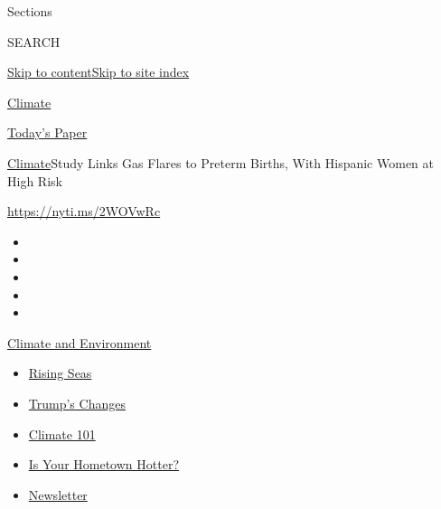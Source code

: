 Sections

SEARCH

\protect\hyperlink{site-content}{Skip to
content}\protect\hyperlink{site-index}{Skip to site index}

\href{https://www.nytimes3xbfgragh.onion/section/climate}{Climate}

\href{https://myaccount.nytimes3xbfgragh.onion/auth/login?response_type=cookie\&client_id=vi}{}

\href{https://www.nytimes3xbfgragh.onion/section/todayspaper}{Today's
Paper}

\href{/section/climate}{Climate}\textbar{}Study Links Gas Flares to
Preterm Births, With Hispanic Women at High Risk

\href{https://nyti.ms/2WOVwRc}{https://nyti.ms/2WOVwRc}

\begin{itemize}
\item
\item
\item
\item
\item
\end{itemize}

\href{https://www.nytimes3xbfgragh.onion/section/climate?action=click\&pgtype=Article\&state=default\&region=TOP_BANNER\&context=storylines_menu}{Climate
and Environment}

\begin{itemize}
\tightlist
\item
  \href{https://www.nytimes3xbfgragh.onion/2020/07/30/climate/sea-level-inland-floods.html?action=click\&pgtype=Article\&state=default\&region=TOP_BANNER\&context=storylines_menu}{Rising
  Seas}
\item
  \href{https://www.nytimes3xbfgragh.onion/interactive/2020/climate/trump-environment-rollbacks.html?action=click\&pgtype=Article\&state=default\&region=TOP_BANNER\&context=storylines_menu}{Trump's
  Changes}
\item
  \href{https://www.nytimes3xbfgragh.onion/interactive/2020/04/19/climate/climate-crash-course-1.html?action=click\&pgtype=Article\&state=default\&region=TOP_BANNER\&context=storylines_menu}{Climate
  101}
\item
  \href{https://www.nytimes3xbfgragh.onion/interactive/2018/08/30/climate/how-much-hotter-is-your-hometown.html?action=click\&pgtype=Article\&state=default\&region=TOP_BANNER\&context=storylines_menu}{Is
  Your Hometown Hotter?}
\item
  \href{https://www.nytimes3xbfgragh.onion/newsletters/climate-change?action=click\&pgtype=Article\&state=default\&region=TOP_BANNER\&context=storylines_menu}{Newsletter}
\end{itemize}

